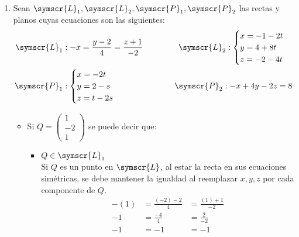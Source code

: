 \documentclass{article}
\def\fancyL{\symscr{L}}
\def\fancyP{\symscr{P}}
\begin{document}
\begin{enumerate}
\begin{figure}
            \label{pt-nineteen-graph}
        \end{figure}
\setcounter{enumi}{20}
\item Sean \(\fancyL_1, \fancyL_2, \fancyP_1, \fancyP_2\) las rectas y planos cuyas ecuaciones son las siguientes:
    \[
        \begin{aligned}
            \fancyL_1 &: -x = \frac{y - 2}{4} = \frac{z + 1}{-2}
            \hspace{1cm}
            &\fancyL_2: 
            \begin{cases}
                x = -1 -2t \\
                y = 4 +8t \\ 
                z = -2 -4t \\
            \end{cases} 
            \\
            \fancyP_1 &:
            \begin{cases}
                x = -2t \\
                y = 2 - s \\
                z = t - 2s
            \end{cases}
            \hspace{1cm}
            &\fancyP_2: -x + 4y - 2z = 8
            \\
        \end{aligned}
    \]
    \begin{itemize}
        \item Si \(Q = \left(\begin{smallmatrix}1 \\ −2 \\ 1\end{smallmatrix}\right)\) se puede decir que:
            \begin{itemize}
                \item \(Q \in \fancyL_1\) \\
                    Si \(Q\) es un punto en \(\fancyL\), al estar la recta en sus ecuaciones simétricas, se debe mantener la igualdad al 
                    reemplazar \(x, y, z\) por cada componente de \(Q\).
                    \[
                        \begin{aligned}
                            -(1) &= \frac{(-2) -2}{4} &= \frac{(1) + 1}{-2} \\
                            -1 &= \frac{-4}{4} &= \frac{2}{-2} \\
                            -1 &= -1 &= -1 \\

\end{aligned}\]
\end{itemize}
\end{itemize}
\end{enumerate}
\end{document}
